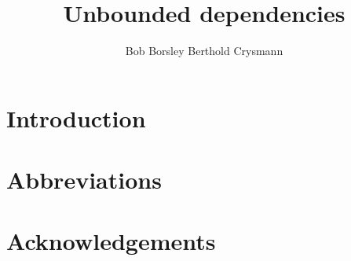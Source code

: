 \documentclass[output=paper]{langsci/langscibook}
\author{%
	Bob Borsley\affiliation{University of Essex}%
	\lastand Berthold Crysmann\affiliation{Université Paris Diderot}%
}
\title{Unbounded dependencies}
\begin{document}
\label{chap-udc}\label{chap-nld}

\section{Introduction} 



 
\section*{Abbreviations}
\section*{Acknowledgements}

\printbibliography[heading=subbibliography,notkeyword=this] 
\end{document}
